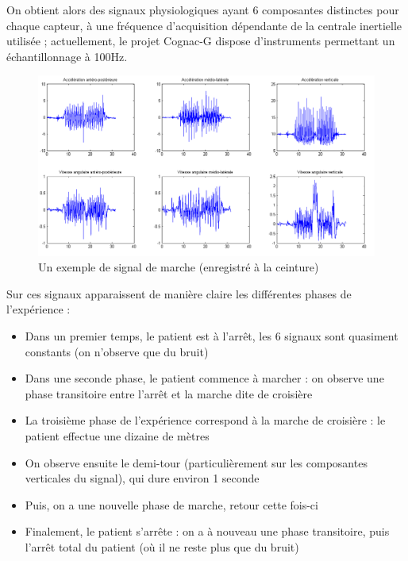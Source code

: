 \documentclass[french,12pt,notitlepage]{report}
\begin{document}
	\vspace{1pc}

	On obtient alors des signaux physiologiques ayant 6 composantes distinctes pour chaque capteur, à une fréquence d'acquisition dépendante de la centrale inertielle utilisée ; actuellement, le projet Cognac-G dispose d'instruments permettant un échantillonnage à 100Hz.

	\begin{figure}[!h]
		\includegraphics[scale=0.5]{ex_signal_back.png}
		\caption{Un exemple de signal de marche (enregistré à la ceinture)}
		\label{ex_signal_back}
	\end{figure}

	Sur ces signaux apparaissent de manière claire les différentes phases de l'expérience :
	\begin{itemize}
		\item Dans un premier temps, le patient est à l'arrêt, les 6 signaux sont quasiment constants (on n'observe que du bruit)
		\item Dans une seconde phase, le patient commence à marcher : on observe une phase transitoire entre l'arrêt et la marche dite de croisière
		\item La troisième phase de l'expérience correspond à la marche de croisière : le patient effectue une dizaine de mètres
		\item On observe ensuite le demi-tour (particulièrement sur les composantes verticales du signal), qui dure environ 1 seconde
		\item Puis, on a une nouvelle phase de marche, retour cette fois-ci
		\item Finalement, le patient s'arrête : on a à nouveau une phase transitoire, puis l'arrêt total du patient (où il ne reste plus que du bruit)
	\end{itemize}
\end{document}
